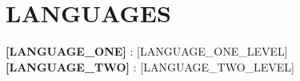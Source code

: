 \documentclass[letterpaper,11pt]{article}
\begin{document}
\section{LANGUAGES}
 \begin{itemize}[leftmargin=0in, label={}]
    \small{\item{
     \textbf{[LANGUAGE_ONE]} {: [LANGUAGE_ONE_LEVEL]} \hspace{24pt}
     \textbf{[LANGUAGE_TWO]} {: [LANGUAGE_TWO_LEVEL]}
    }}
 \end{itemize}

\end{document}
